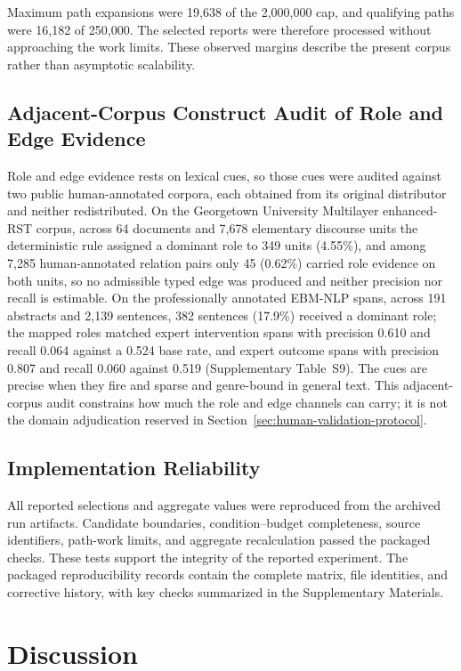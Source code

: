 \documentclass[information,article,submit,moreauthors]{Definitions/mdpi}
\begin{document}
Maximum path expansions were 19,638 of the 2,000,000 cap, and qualifying paths were 16,182 of 250,000. The selected reports were therefore processed without approaching the work limits. These observed margins describe the present corpus rather than asymptotic scalability.

\subsection{Adjacent-Corpus Construct Audit of Role and Edge Evidence}
\label{sec:construct-audit}

Role and edge evidence rests on lexical cues, so those cues were audited against two public human-annotated corpora, each obtained from its original distributor and neither redistributed. On the Georgetown University Multilayer enhanced-RST corpus, across 64 documents and 7,678 elementary discourse units the deterministic rule assigned a dominant role to 349 units (4.55\%), and among 7,285 human-annotated relation pairs only 45 (0.62\%) carried role evidence on both units, so no admissible typed edge was produced and neither precision nor recall is estimable. On the professionally annotated EBM-NLP spans, across 191 abstracts and 2,139 sentences, 382 sentences (17.9\%) received a dominant role; the mapped roles matched expert intervention spans with precision 0.610 and recall 0.064 against a 0.524 base rate, and expert outcome spans with precision 0.807 and recall 0.060 against 0.519 (Supplementary Table~S9). The cues are precise when they fire and sparse and genre-bound in general text. This adjacent-corpus audit constrains how much the role and edge channels can carry; it is not the domain adjudication reserved in Section~\ref{sec:human-validation-protocol}.

\subsection{Implementation Reliability}

All reported selections and aggregate values were reproduced from the archived run artifacts. Candidate boundaries, condition--budget completeness, source identifiers, path-work limits, and aggregate recalculation passed the packaged checks. These tests support the integrity of the reported experiment. The packaged reproducibility records contain the complete matrix, file identities, and corrective history, with key checks summarized in the Supplementary Materials.

\section{Discussion}
\end{document}
